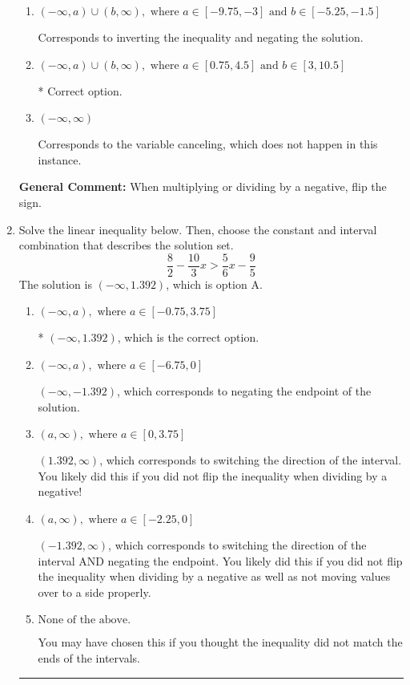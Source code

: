 \documentclass{extbook}[14pt]
\newcommand{\litem}[1]{\item #1

\rule{\textwidth}{0.4pt}}
\begin{document}
\begin{enumerate}
{\begin{enumerate}[label=\Alph*.]
Corresponds to including the endpoints AND negating.
\item \( (-\infty, a) \cup (b, \infty), \text{ where } a \in [-9.75, -3] \text{ and } b \in [-5.25, -1.5] \)

Corresponds to inverting the inequality and negating the solution.
\item \( (-\infty, a) \cup (b, \infty), \text{ where } a \in [0.75, 4.5] \text{ and } b \in [3, 10.5] \)

 * Correct option.
\item \( (-\infty, \infty) \)

Corresponds to the variable canceling, which does not happen in this instance.
\end{enumerate}

\textbf{General Comment:} When multiplying or dividing by a negative, flip the sign.
}
\litem{
Solve the linear inequality below. Then, choose the constant and interval combination that describes the solution set.
\[ \frac{8}{2} - \frac{10}{3} x > \frac{5}{6} x - \frac{9}{5} \]The solution is \( (-\infty, 1.392) \), which is option A.\begin{enumerate}[label=\Alph*.]
\item \( (-\infty, a), \text{ where } a \in [-0.75, 3.75] \)

* $(-\infty, 1.392)$, which is the correct option.
\item \( (-\infty, a), \text{ where } a \in [-6.75, 0] \)

 $(-\infty, -1.392)$, which corresponds to negating the endpoint of the solution.
\item \( (a, \infty), \text{ where } a \in [0, 3.75] \)

 $(1.392, \infty)$, which corresponds to switching the direction of the interval. You likely did this if you did not flip the inequality when dividing by a negative!
\item \( (a, \infty), \text{ where } a \in [-2.25, 0] \)

 $(-1.392, \infty)$, which corresponds to switching the direction of the interval AND negating the endpoint. You likely did this if you did not flip the inequality when dividing by a negative as well as not moving values over to a side properly.
\item \( \text{None of the above}. \)

You may have chosen this if you thought the inequality did not match the ends of the intervals.
\end{enumerate}

}
\end{enumerate}
\end{document}
